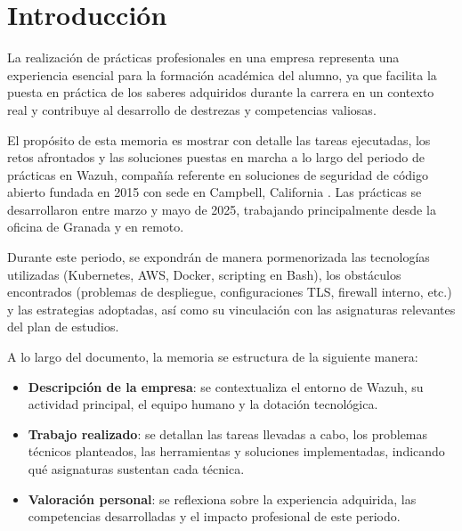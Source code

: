 \chapter{Introducción}

La realización de prácticas profesionales en una empresa representa una experiencia esencial para la formación académica del alumno, ya que facilita la puesta en práctica de los saberes adquiridos durante la carrera en un contexto real y contribuye al desarrollo de destrezas y competencias valiosas.

El propósito de esta memoria es mostrar con detalle las tareas ejecutadas, los retos afrontados y las soluciones puestas en marcha a lo largo del periodo de prácticas en Wazuh, compañía referente en soluciones de seguridad de código abierto fundada en 2015 con sede en Campbell, California \cite{wazuh_about_us}. Las prácticas se desarrollaron entre marzo y mayo de 2025, trabajando principalmente desde la oficina de Granada y en remoto.

Durante este periodo, se expondrán de manera pormenorizada las tecnologías utilizadas (Kubernetes, AWS, Docker, scripting en Bash), los obstáculos encontrados (problemas de despliegue, configuraciones TLS, firewall interno, etc.) y las estrategias adoptadas, así como su vinculación con las asignaturas relevantes del plan de estudios.

A lo largo del documento, la memoria se estructura de la siguiente manera:
\begin{itemize}
  \item \textbf{Descripción de la empresa}: se contextualiza el entorno de Wazuh, su actividad principal, el equipo humano y la dotación tecnológica.  
  \item \textbf{Trabajo realizado}: se detallan las tareas llevadas a cabo, los problemas técnicos planteados, las herramientas y soluciones implementadas, indicando qué asignaturas sustentan cada técnica.  
  \item \textbf{Valoración personal}: se reflexiona sobre la experiencia adquirida, las competencias desarrolladas y el impacto profesional de este periodo.
\end{itemize}